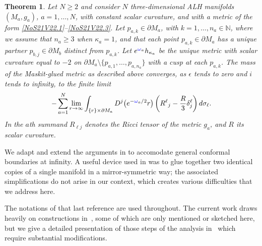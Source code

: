 \documentclass[10pt,a4paper]{article}
\numberwithin{equation}{section}
\newtheorem{Theorem}{Theorem}[section]
\newcommand{\blue}[1]{{\color{blue}#1}}
\newcommand{\N}{\mathbb N}
\newcommand{\ominf}{\blue{\omega}}
\begin{document}
\begin{Theorem}\label{NoST29VII21.1}
Let $N\ge 2$ and consider $N$ three-dimensional ALH manifolds $(M_a,g_a)$, $a=1,\dots, N$, with constant scalar curvature, and with a metric of the form \eqref{NoS21V22.1}--\eqref{NoS21V22.3}.
Let $p_{a,k}\in \partial M_a$, with $k=1,\dots,n_a \in \N$, where we assume that $n_a\ge 3$ when $\kappa_a =1$, and that each point $p_{a,k}\in \partial M_a$ has a unique partner $p_{b,j} \in \partial M_b$ {distinct from $ p_{a,k}$}.
 Let ${\rm e}^{\ominf_a } h_{\kappa_a}$ be the unique metric with scalar curvature equal to $-2$ on $\partial M_a \setminus \{p_{a,1},\dots,p_{a,n_a}\}$ with a cusp at {each} $p_{a,k}$. The mass of the Maskit-glued metric as described above converges, as $\epsilon$ tends to zero and $i$ tends to infinity, to the finite limit
\begin{equation}\label{18XI22.1}
 -  \sum_{a=1}^{N}
 \lim_{r\rightarrow \infty}\int_{\{r\} \times \partial M_a}
 D^j \big({\rm e}^{-\ominf_a/2}r \big)
 \left( R{}^\ell{}_j - \frac {R{}}{3}\delta^\ell_j\right)
{\rm d}\sigma_\ell.
\end{equation}
In the $a$th summand $R_{\ell j}$ denotes the Ricci tensor of the metric $g_a$, and $R$ its scalar curvature.
\end{Theorem}


We adapt and extend the arguments in \cite{CDW} to accomodate general conformal boundaries at infinity. A useful device used in \cite{CDW} was to glue together two identical copies of a single manifold in a mirror-symmetric way; the associated simplifications do not arise in our context, which creates various difficulties that we address here.

The notations of that last reference are used throughout. {The current work draws heavily on constructions in~\cite{CDW}, some of which are only mentioned or sketched here, but we give a detailed presentation of those steps of the analysis in~\cite{CDW} which require substantial modifications.}
\end{document}

